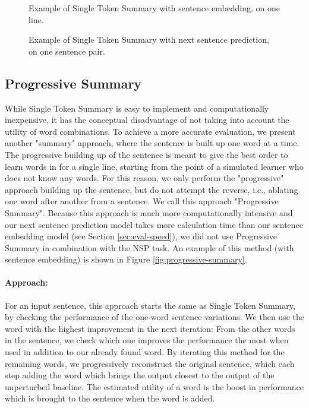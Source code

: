 \begin{figure}[H]
	
	\caption{Example of Single Token Summary with sentence embedding, on one line.}
	\label{fig:single-token-summary-sentemb}
\end{figure}

\begin{figure}[H]
	
	\caption{Example of Single Token Summary with next sentence prediction, on one sentence pair.}
	\label{fig:single-token-summary-nsp}
\end{figure}


\subsection{Progressive Summary}
While Single Token Summary is easy to implement and computationally inexpensive, it has the conceptual disadvantage of not taking into account the utility of word combinations.
To achieve a more accurate evaluation, we present another "summary" approach, where the sentence is built up one word at a time.
The progressive building up of the sentence is meant to give the best order to learn words in for a single line, starting from the point of a simulated learner who does not know any words.
For this reason, we only perform the "progressive" approach building up the sentence, but do not attempt the reverse, i.e., ablating one word after another from a sentence.
We call this approach "Progressive Summary".
Because this approach is much more computationally intensive and our next sentence prediction model takes more calculation time than our sentence embedding model (see Section \ref{sec:eval-speed}), we did not use Progressive Summary in combination with the NSP task.
An example of this method (with sentence embedding) is shown in Figure \ref{fig:progressive-summary}.

\paragraph{Approach:}
For an input sentence, this approach starts the same as Single Token Summary, by checking the performance of the one-word sentence variations.
We then use the word with the highest improvement in the next iteration:
From the other words in the sentence, we check which one improves the performance the most when used in addition to our already found word.
By iterating this method for the remaining words, we progressively reconstruct the original sentence, which each step adding the word which brings the output closest to the output of the unperturbed baseline.
The estimated utility of a word is the boost in performance which is brought to the sentence when the word is added.

